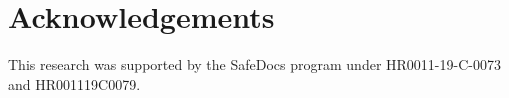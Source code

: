 \documentclass[conference,10pt]{IEEEtran}
\begin{document}






\section*{Acknowledgements}

This research was supported by the SafeDocs program under HR0011-19-C-0073 and HR001119C0079.





\appendix


\end{document}
